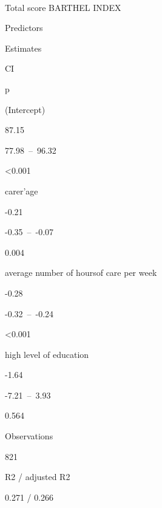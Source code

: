 \documentclass[]{article}
\begin{document}
~

Total score BARTHEL INDEX

Predictors

Estimates

CI

p

(Intercept)

87.15

77.98~--~96.32

\textless{}0.001

carer'age

-0.21

-0.35~--~-0.07

0.004

average number of hoursof care per week

-0.28

-0.32~--~-0.24

\textless{}0.001

high level of education

-1.64

-7.21~--~3.93

0.564

Observations

821

R2 / adjusted R2

0.271 / 0.266
\end{document}
